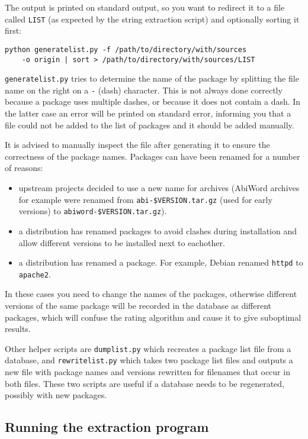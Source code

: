 \documentclass[10pt]{article}
\begin{document}
The output is printed on standard output, so you want to redirect it to a file
called \texttt{LIST} (as expected by the string extraction script) and
optionally sorting it first:

\begin{verbatim}
python generatelist.py -f /path/to/directory/with/sources
    -o origin | sort > /path/to/directory/with/sources/LIST
\end{verbatim}

\texttt{generatelist.py} tries to determine the name of the package by
splitting the file name on the right on a \texttt{-} (dash)
character. This is not always done correctly because a package uses multiple
dashes, or because it does not contain a dash. In the latter case an error
will be printed on standard error, informing you that a file could not be
added to the list of packages and it should be added manually.

It is advised to manually inspect the file after generating it to ensure the
correctness of the package names. Packages can have been renamed for a number
of reasons:

\begin{itemize}
\item upstream projects decided to use a new name for archives (AbiWord
archives for example were renamed from \texttt{abi-\$VERSION.tar.gz} (used for
early versions) to \texttt{abiword-\$VERSION.tar.gz}).
\item a distribution has renamed packages to avoid clashes during installation
and allow different versions to be installed next to eachother.
\item a distribution has renamed a package. For example, Debian renamed
\texttt{httpd} to \texttt{apache2}.
\end{itemize}

In these cases you need to change the names of the packages, otherwise
different versions of the same package will be recorded in the database as
different packages, which will confuse the rating algorithm and cause it to
give suboptimal results.

Other helper scripts are \texttt{dumplist.py} which recreates a package list
file from a database, and \texttt{rewritelist.py} which takes two package list
files and outputs a new file with package names and versions rewritten for
filenames that occur in both files. These two scripts are useful if a database
needs to be regenerated, possibly with new packages.

\subsection{Running the extraction program}
\end{document}
